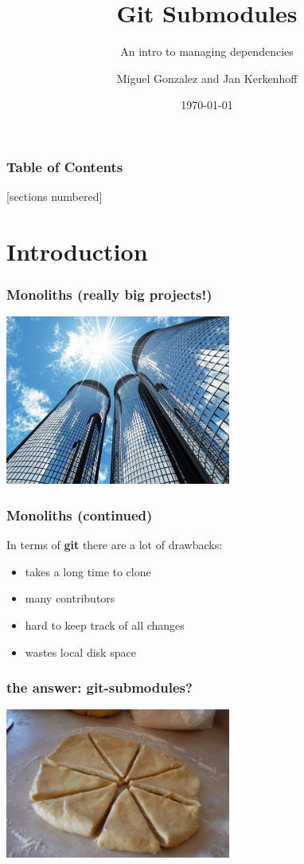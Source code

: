 \documentclass[10pt]{beamer}
\title{Git Submodules}
\subtitle{An intro to managing dependencies}
\date{\today}
\author{Miguel Gonzalez and Jan Kerkenhoff}
\institute{Fontys Hogeschool Venlo}
\begin{document}
\maketitle

\begin{frame}
  \frametitle{Table of Contents}
  [sections numbered]
  \tableofcontents[hideallsubsections]
\end{frame}


\section{Introduction}

\begin{frame}
  \frametitle{Monoliths (really big projects!)}
  \begin{center}\includegraphics[width=280px]{images/monoliths.jpg}\end{center}
\end{frame}

\begin{frame}
  \frametitle{Monoliths (continued)}
  In terms of \textbf{git} there are a lot of drawbacks:
  \begin{itemize}
  	\item takes a long time to clone
  	\item many contributors
  	\item hard to keep track of all changes
  	\item wastes local disk space
  \end{itemize}  
\end{frame}

\begin{frame}
  \frametitle{the answer: git-submodules?}
  \begin{center}\includegraphics[width=280px]{images/divide.jpg}\end{center}
\end{frame}
\end{document}
